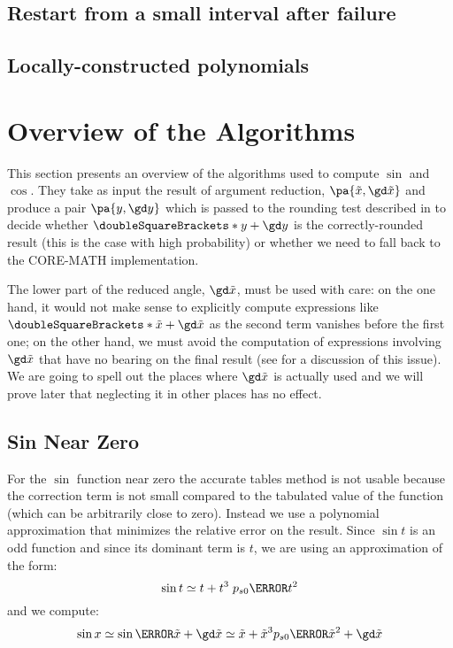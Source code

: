 \documentclass[10pt, a4paper, twoside]{basestyle}
\newcommand{\round}[1]{\doubleSquareBrackets*{#1}}
\newcommand{\red}[1]{\tilde{#1}}
\begin{document}
\subsection*{Restart from a small interval after failure}

\subsection*{Locally-constructed polynomials}

\section*{Overview of the Algorithms}\label{overview}

This section presents an overview of the algorithms used to compute $\sin$ and $\cos$.  They take as input the result of argument reduction, $\pa{\red x, \gd \red x}$ and produce a pair $\pa{y, \gd y}$ which is passed to the rounding test described in \cite[397]{MullerBrisebarreDeDinechinJeannerodLefevreMelquiondRevolStehleTorres2010} to decide whether $\round{y + \gd y}$ is the correctly-rounded result (this is the case with high probability) or whether we need to fall back to the CORE-MATH implementation.

The lower part of the reduced angle, $\gd \red x$, must be used with care: on the one hand, it would not make sense to explicitly compute expressions like $\round{\red x + \gd \red x}$ as the second term vanishes before the first one; on the other hand, we must avoid the computation of expressions involving $\gd \red x$ that have no bearing on the final result (see \cite[402-404]{MullerBrisebarreDeDinechinJeannerodLefevreMelquiondRevolStehleTorres2010} for a discussion of this issue).  We are going to spell out the places where $\gd \red x$ is actually used and we will prove later that neglecting it in other places has no effect.

\subsection*{Sin Near Zero}

For the $\sin$ function near zero the accurate tables method is not usable because the correction term is not small compared to the tabulated value of the function (which can be arbitrarily close to zero).  Instead we use a polynomial approximation that minimizes the relative error on the result.  Since $\sin t$ is an odd function and since its dominant term is $t$, we are using an approximation of the form:
\[
\sin t \simeq t + t^3 \; p_{s0}\of{t^2}
\]
and we compute:
\[
\sin x \simeq \sin\of{\red x + \gd \red x} \simeq \red x + {\red x}^3 p_{s0}\of{{\red x}^2} + \gd \red x
\]
\end{document}

